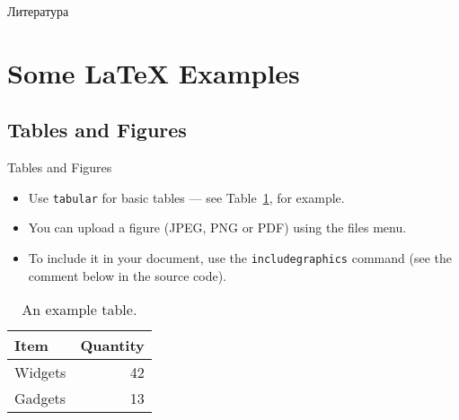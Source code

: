 \documentclass{beamer}
\begin{document}
	\begin{frame}{Литература}
	\end{frame}





































\iffalse
\section{Some \LaTeX{} Examples}

\subsection{Tables and Figures}

\begin{frame}{Tables and Figures}

\begin{itemize}
\item Use \texttt{tabular} for basic tables --- see Table~\ref{tab:widgets}, for example.
\item You can upload a figure (JPEG, PNG or PDF) using the files menu. 
\item To include it in your document, use the \texttt{includegraphics} command (see the comment below in the source code).
\end{itemize}


\begin{table}
\centering
\begin{tabular}{l|r}
Item & Quantity \\\hline
Widgets & 42 \\
Gadgets & 13
\end{tabular}
\caption{\label{tab:widgets}An example table.}
\end{table}

\end{frame}
\end{document}
